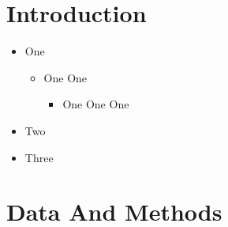 \documentclass[twoside]{article}\usepackage[]{graphicx}\usepackage[]{color}
\begin{document}
\begin{multicols}{2} %




\section{Introduction}


\lipsum[1]
\cite{renwick_chemical_2002}

\begin{itemize}
  \item One
    \begin{itemize}
      \item One One
        \begin{itemize}
          \item One One One
        \end{itemize}
    \end{itemize}
  \item Two
  \item Three
\end{itemize}

\lipsum[1-2]





\section{Data And Methods}


\lipsum[1] 




\end{multicols}
\end{document}
